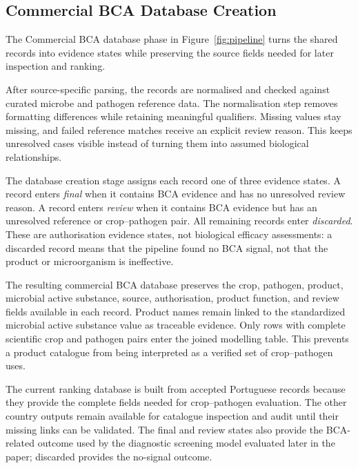 \subsection{Commercial BCA Database Creation} \label{subsec:commercial-bca-database}

The Commercial BCA database phase in Figure~\ref{fig:pipeline} turns the shared records into evidence states while preserving the source fields needed for later inspection and ranking.

After source-specific parsing, the records are normalised and checked against curated microbe and pathogen reference data.
The normalisation step removes formatting differences while retaining meaningful qualifiers.
Missing values stay missing, and failed reference matches receive an explicit review reason.
This keeps unresolved cases visible instead of turning them into assumed biological relationships.

The database creation stage assigns each record one of three evidence states.
A record enters \textit{final} when it contains BCA evidence and has no unresolved review reason.
A record enters \textit{review} when it contains BCA evidence but has an unresolved reference or crop--pathogen pair.
All remaining records enter \textit{discarded}.
These are authorisation evidence states, not biological efficacy assessments: a discarded record means that the pipeline found no BCA signal, not that the product or microorganism is ineffective.

The resulting commercial BCA database preserves the crop, pathogen, product, microbial active substance, source, authorisation, product function, and review fields available in each record.
Product names remain linked to the standardized microbial active substance value as traceable evidence.
Only rows with complete scientific crop and pathogen pairs enter the joined modelling table.
This prevents a product catalogue from being interpreted as a verified set of crop--pathogen uses.

The current ranking database is built from accepted Portuguese records because they provide the complete fields needed for crop--pathogen evaluation.
The other country outputs remain available for catalogue inspection and audit until their missing links can be validated.
The final and review states also provide the BCA-related outcome used by the diagnostic screening model evaluated later in the paper; discarded provides the no-signal outcome.
